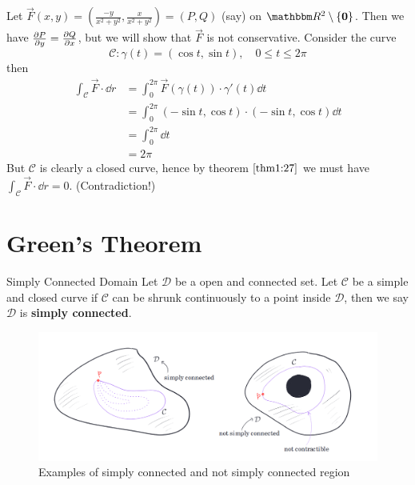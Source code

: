 \documentclass[../Analysis-3]{subfiles}
\begin{document}
\begin{Eg}{}{}
    Let $\vec{F}(x,y) = \left( \frac{-y}{x^2+y^2}, \frac{x}{x^2+y^2} \right) = (P,Q)$ (say) on $\R^2 \setminus \{\mathbf{0}\}$. Then we have $\pdv{P}{y} = \pdv{Q}{x}$, but we will show that $\vec{F}$ is not conservative. Consider the curve
    \[
        \mathcal{C} : \gamma(t) = ( \cos t, \sin t), \quad 0 \leq t \leq 2\pi
    \]
    then
    \begin{align*}
        \int_{\mathcal{C}} \vec{F} \cdot \dd r & = \int_0^{2\pi}  \vec{F}(\gamma(t))\cdot \gamma'(t)  \dd t       \\
                                               & = \int_0^{2\pi}  (-\sin t, \cos t) \cdot (-\sin t, \cos t) \dd t \\
                                               & = \int_0^{2\pi} \dd t                                            \\
                                               & = 2\pi
    \end{align*}
    But $\mathcal{C}$ is clearly a closed curve, hence by theorem $\ref{thm1:27}$ we must have $\int_{\mathcal{C}} \vec{F} \cdot \dd r = 0$. (Contradiction!)
\end{Eg}

\section{Green's Theorem}

\begin{Def}{Simply Connected Domain}{}
    Let $\mathcal{D}$ be a open and connected set. Let $\mathcal{C}$ be a simple and closed curve if $\mathcal{C}$ can be shrunk continuously to a point inside $\mathcal{D}$, then we say $\mathcal{D}$ is \textbf{simply connected}.
\end{Def}

\begin{figure}[h]
    \centering
    \includegraphics[width=\textwidth]{../figures/lec27.4.png}
    \caption{Examples of simply connected and not simply connected region}
    \label{fig4:27}
\end{figure}
\end{document}
